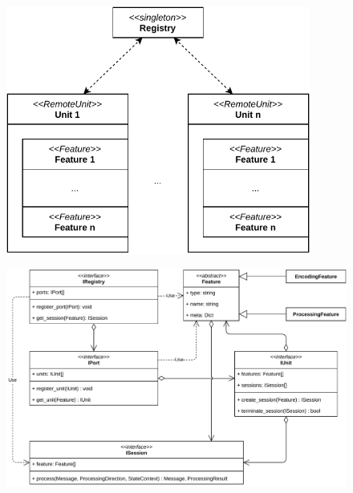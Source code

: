 \begin{figure}[H]
    \centering
    \includegraphics[width=10cm]{img/ch05/registry-remoteunit.pdf}
    \label{fig:registry-units}
\end{figure}
\begin{figure}[ht]
    \centering
    \includegraphics[width=14cm]{img/ch05/component-view2-3-registry-port-unit.pdf}
    \label{fig:component-view2-3-registry-port-unit}
\end{figure}
